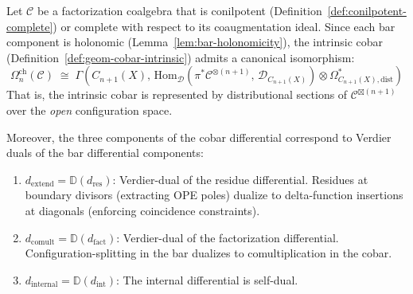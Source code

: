 \begin{theorem}%
\label{thm:cobar-distributional-model}
Let $\mathcal{C}$ be a factorization coalgebra that is conilpotent
(Definition~\ref{def:conilpotent-complete}) or complete with respect to
its coaugmentation ideal.
Since each bar component is holonomic (Lemma~\ref{lem:bar-holonomicity}), the intrinsic cobar
(Definition~\ref{def:geom-cobar-intrinsic}) admits a canonical isomorphism:
\[
\Omega^{\mathrm{ch}}_n(\mathcal{C})
\;\cong\;
\Gamma\!\left(C_{n+1}(X),\,
  \mathrm{Hom}_{\mathcal{D}}\!\left(\pi^*\mathcal{C}^{\otimes(n+1)},\,
  \mathcal{D}_{C_{n+1}(X)}\right)
  \otimes \Omega^*_{C_{n+1}(X),\mathrm{dist}}
\right)
\]
That is, the intrinsic cobar is represented by distributional sections of
$\mathcal{C}^{\boxtimes(n+1)}$ over the \emph{open} configuration space.

Moreover, the three components of the cobar differential correspond to
Verdier duals of the bar differential components:
\begin{enumerate}[label=\textup{(\roman*)}]
\item $d_{\mathrm{extend}} = \mathbb{D}(d_{\mathrm{res}})$:
  Verdier-dual of the residue differential.  Residues at boundary
  divisors (extracting OPE poles) dualize to delta-function insertions
  at diagonals (enforcing coincidence constraints).
\item $d_{\mathrm{comult}} = \mathbb{D}(d_{\mathrm{fact}})$:
  Verdier-dual of the factorization differential.  Configuration-splitting
  in the bar dualizes to comultiplication in the cobar.
\item $d_{\mathrm{internal}} = \mathbb{D}(d_{\mathrm{int}})$:
  The internal differential is self-dual.
\end{enumerate}
\end{theorem}

